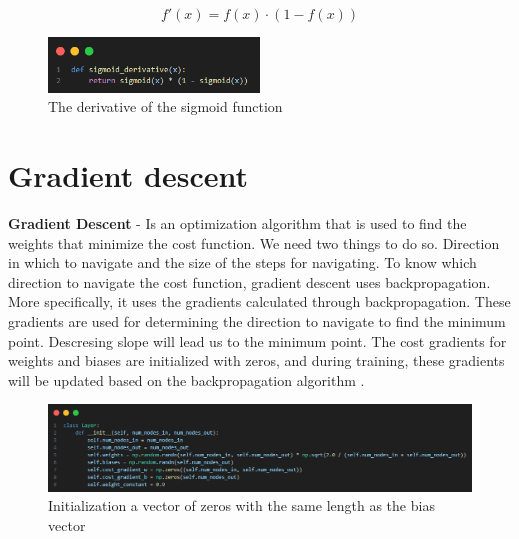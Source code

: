 \documentclass{article}
\begin{document}
\begin{equation}
    f'(x) = f(x) \cdot (1 - f(x))
\end{equation}

\begin{figure}[ht]
    \centering
    \includegraphics[width=0.5\textwidth]{images/sigmoid-derivative.png}
    \caption{The derivative of the sigmoid function}
    \label{fig:sigmoid_derivativse_function}
\end{figure}

\newpage
\section{Gradient descent}
\textbf{Gradient Descent} - Is an optimization algorithm that is used to find the weights that minimize the cost function. 
We need two things to do so. Direction in which to navigate and the size of the steps for navigating.
To know which direction to navigate the cost function, gradient descent uses backpropagation. More specifically, it uses the gradients calculated through backpropagation. These gradients are used for determining the direction to navigate to find the minimum point. Descresing slope will lead us to the minimum point.
The cost gradients for weights and biases are initialized with zeros, and during training, these gradients will be updated based on the backpropagation algorithm \cite{algorithms} .

\begin{figure}[ht]
    \centering 
    \includegraphics[width=1\textwidth]{images/Xavier-Glorot-initialization-for-weights.png}
    \caption{Initialization a vector of zeros with the same length as the bias vector}
    \label{fig:initialized_cost_gradient}
\end{figure}
\end{document}

